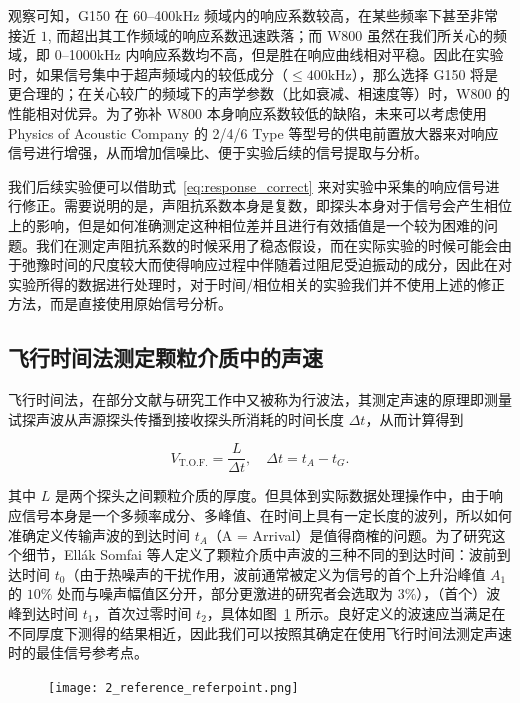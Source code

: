 观察可知，G150 在 \numrange{60}{400}\unit{\kilo\hertz} 频域内的响应系数较高，在某些频率下甚至非常接近 $1$, 而超出其工作频域的响应系数迅速跌落；而 W800 虽然在我们所关心的频域，即 \numrange{0}{1000}\unit{\kilo\hertz} 内响应系数均不高，但是胜在响应曲线相对平稳。因此在实验时，如果信号集中于超声频域内的较低成分（$\leq 400\unit{\kilo\hertz}$），那么选择 G150 将是更合理的；在关心较广的频域下的声学参数（比如衰减、相速度等）时，W800 的性能相对优异。为了弥补 W800 本身响应系数较低的缺陷，未来可以考虑使用 Physics of Acoustic Company 的 2/4/6 Type 等型号的供电前置放大器来对响应信号进行增强，从而增加信噪比、便于实验后续的信号提取与分析。

我们后续实验便可以借助式~\eqref{eq:response_correct} 来对实验中采集的响应信号进行修正。需要说明的是，声阻抗系数本身是复数，即探头本身对于信号会产生相位上的影响，但是如何准确测定这种相位差并且进行有效插值是一个较为困难的问题。我们在测定声阻抗系数的时候采用了稳态假设，而在实际实验的时候可能会由于弛豫时间的尺度较大而使得响应过程中伴随着过阻尼受迫振动的成分，因此在对实验所得的数据进行处理时，对于时间/相位相关的实验我们并不使用上述的修正方法，而是直接使用原始信号分析。

\subsection{飞行时间法测定颗粒介质中的声速}\label{sec:tof}

飞行时间法，在部分文献与研究工作中又被称为行波法，其测定声速的原理即测量试探声波从声源探头传播到接收探头所消耗的时间长度 $\Delta t$，从而计算得到

\begin{equation}
  V_{\text{T.O.F.}} = \frac{L}{\Delta t},\quad \Delta t = t_{A} - t_{G}.
\end{equation}

其中 $L$ 是两个探头之间颗粒介质的厚度。但具体到实际数据处理操作中，由于响应信号本身是一个多频率成分、多峰值、在时间上具有一定长度的波列，所以如何准确定义传输声波的到达时间 $t_{A}$（A = Arrival）是值得商榷的问题。为了研究这个细节，Ellák Somfai 等人定义了颗粒介质中声波的三种不同的到达时间：波前到达时间 $t_{0}$（由于热噪声的干扰作用，波前通常被定义为信号的首个上升沿峰值 $A_{1}$ 的 $10\%$ 处而与噪声幅值区分开，部分更激进的研究者会选取为 $3\%$），（首个）波峰到达时间 $t_{1}$，首次过零时间 $t_{2}$，具体如图~\ref{fig:ref_reference_point} 所示\cite{PhysRevE.72.021301}。良好定义的波速应当满足在不同厚度下测得的结果相近，因此我们可以按照其确定在使用飞行时间法测定声速时的最佳信号参考点。

\begin{figure}[!htp]
  \centering
  \texttt{[image: 2\_reference\_referpoint.png]}
  \label{fig:ref_reference_point}
\end{figure}

